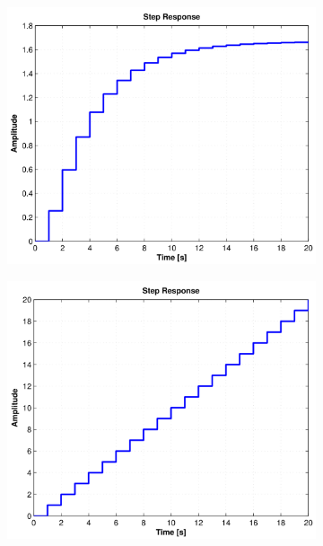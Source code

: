\documentclass[twoside]{article}
\begin{document}
\begin{figure}[htbp]
\medskip
\begin{subfigure}{0.25\textwidth}
  \includegraphics[width=\linewidth]{zadani11-d}
  \caption{}
  \label{fig:charakteristiky:d}
\end{subfigure}\hfil %
\begin{subfigure}{0.25\textwidth}
	\includegraphics[width=\linewidth]{zadani11-e}
	\caption{}
	\label{fig:charakteristiky:e}
\end{subfigure}\hfil %
\begin{subfigure}{0.25\textwidth}

\end{subfigure}
\end{figure}
\end{document}
